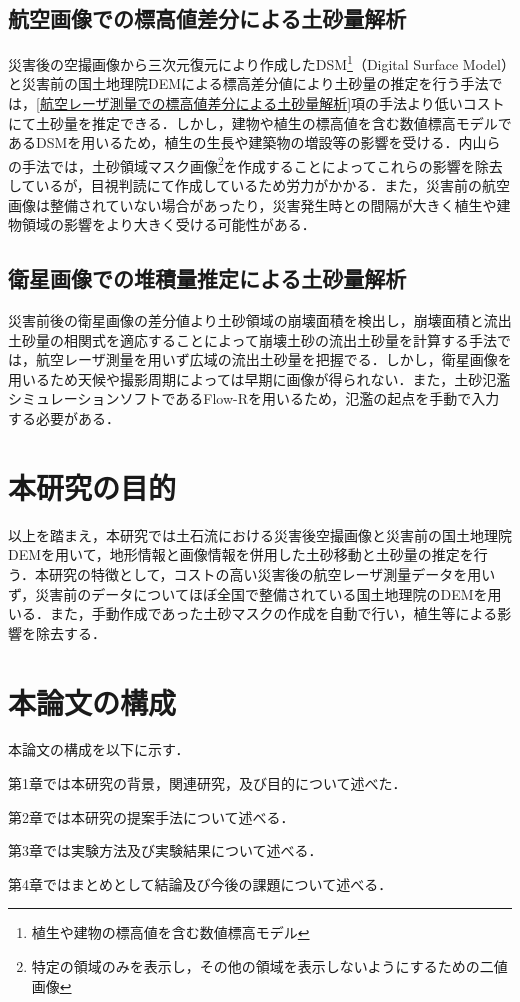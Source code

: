     \subsection{航空画像での標高値差分による土砂量解析}
      災害後の空撮画像から三次元復元により作成したDSM\footnote{植生や建物の標高値を含む数値標高モデル}（Digital Surface Model）と災害前の国土地理院DEM\cite{基盤地図情報}による標高差分値により土砂量の推定を行う手法\cite{土砂量解析3}では，\ref{航空レーザ測量での標高値差分による土砂量解析}項の手法より低いコストにて土砂量を推定できる．しかし，建物や植生の標高値を含む数値標高モデルであるDSMを用いるため，植生の生長や建築物の増設等の影響を受ける．内山らの手法\cite{土砂量解析4}では，土砂領域マスク画像\footnote{特定の領域のみを表示し，その他の領域を表示しないようにするための二値画像}を作成することによってこれらの影響を除去しているが，目視判読にて作成しているため労力がかかる．また，災害前の航空画像は整備されていない場合があったり，災害発生時との間隔が大きく植生や建物領域の影響をより大きく受ける可能性がある．
    

    \subsection{衛星画像での堆積量推定による土砂量解析}
      災害前後の衛星画像の差分値より土砂領域の崩壊面積を検出し，崩壊面積と流出土砂量の相関式を適応することによって崩壊土砂の流出土砂量を計算する手法\cite{土砂量解析5}では，航空レーザ測量を用いず広域の流出土砂量を把握でる．しかし，衛星画像を用いるため天候や撮影周期によっては早期に画像が得られない．また，土砂氾濫シミュレーションソフトであるFlow-R\cite{Flow-R}を用いるため，氾濫の起点を手動で入力する必要がある．



  \section{本研究の目的}
    以上を踏まえ，本研究では土石流における災害後空撮画像と災害前の国土地理院
    DEMを用いて，地形情報と画像情報を併用した土砂移動と土砂量の推定を行う．本研究の特徴として，コストの高い災害後の航空レーザ測量データを用いず，災害前のデータについてほぼ全国で整備されている国土地理院のDEMを用いる．また，手動作成であった土砂マスクの作成を自動で行い，植生等による影響を除去する．

    

  \section{本論文の構成}
    本論文の構成を以下に示す．
    
    第1章では本研究の背景，関連研究，及び目的について述べた．

    第2章では本研究の提案手法について述べる．

    第3章では実験方法及び実験結果について述べる．

    第4章ではまとめとして結論及び今後の課題について述べる．
